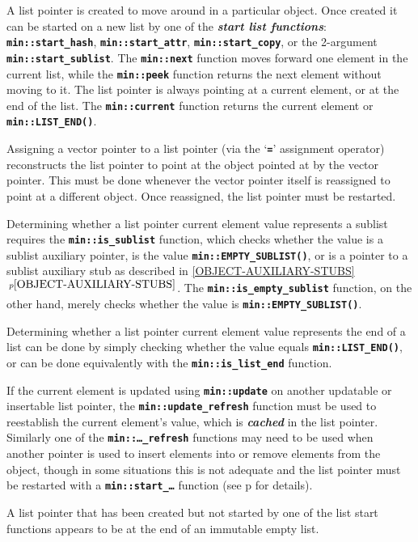 \documentclass[12pt]{article}
\newcommand{\TT}[1]{{\tt \bfseries #1}}
\newcommand{\skey}[2]{{\bf \em #1#2}\index{#1}}
\newcommand{\ikey}[2]{{\bf \em #1}\index{#2}}
\newcommand{\itemref}[1]{\ref{#1}$\,^{p\pageref{#1}}$}
\newcommand{\pagref}[1]{p\pageref{#1}}
\newcommand{\EOL}{\penalty \exhyphenpenalty}
\begin{document}
A list pointer is created to move around in a particular object.
Once created it can be started on a new list by one of the
\skey{start list function}s:
\TT{min::\EOL start\_\EOL hash}, \TT{min::\EOL start\_\EOL attr},
\TT{min::\EOL start\_\EOL copy}, or
the 2-argument \TT{min::\EOL start\_\EOL sublist}.
The \TT{min::\EOL next} function moves forward one element
in the current list,
while the \TT{min::\EOL peek} function returns the next element without
moving to it.
The list pointer is always pointing at a current element, or at
the end of the list.
The \TT{min::\EOL current} function returns the current element
or \TT{min::\EOL LIST\_\EOL END()}.

Assigning a vector pointer to a list pointer (via the `\TT{=}' assignment
operator) reconstructs the
list pointer to point at the object pointed at by the vector
pointer.  This must be done whenever the vector pointer itself
is reassigned to point at a different object.  Once reassigned,
the list pointer must be restarted.

Determining whether a list pointer current element value
represents a sublist requires
the \TT{min::\EOL is\_\EOL sublist} function, which checks whether the
value is a sublist auxiliary pointer,
is the value \TT{min::\EOL EMPTY\_\EOL SUBLIST()},
or is a pointer to a sublist auxiliary stub as described in
\itemref{OBJECT-AUXILIARY-STUBS}.
The \TT{min::\EOL is\_\EOL empty\_\EOL sublist}
function, on the other hand, merely checks whether the value is
\TT{min::\EOL EMPTY\_\EOL SUBLIST()}.

Determining whether a list pointer current element value
represents the end of a list can be done by
simply checking whether the value equals \TT{min::\EOL LIST\_\EOL END()},
or can be done equivalently
with the \TT{min::\EOL is\_\EOL list\_\EOL end} function.

If the current element
is updated using \TT{min::\EOL update}
on another updatable or insertable list pointer,
the \TT{min::\EOL update\_\EOL refresh} function
must be used to reestablish the
current element's value,
which is \ikey{cached}{cache!list pointer}\label{LIST-POINTER-CACHE}
in the list pointer.
Similarly one of the \TT{min::\EOL\ldots\_refresh} functions may
need to be used when another pointer is used to insert elements into
or remove elements
from the object, though in some situations this is
not adequate and the list pointer must be restarted
with a \TT{min::\EOL start\_\dots} function
(see \pagref{RESTARTING_LIST_PTR} for details).

A list pointer that has been created but not started by one of the
list start functions appears to be
at the end of an immutable empty list.
\end{document}
